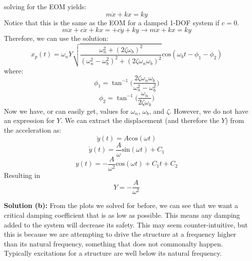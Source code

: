 \documentclass[12pt,letter]{article}
\begin{document}
\begin{example}
			solving for the EOM yields:
			\begin{equation}
				m\ddot{x} + kx = ky
			\end{equation} 				
			Notice that this is the same as the EOM for a damped 1-DOF system if $c=0$.	
			\begin{equation}
			m\ddot{x} + c\dot{x} + kx = + c\dot{y} + ky \rightarrow m\ddot{x} + kx = ky
			\end{equation}
			Therefore, we can use the solution:
			\begin{equation}
				x_p(t) = 	\omega_n Y   \sqrt{\frac{\omega_n^2 + (2 \zeta \omega_b)^2 }{(\omega_n^2 - \omega_b^2)^2 +  (2\zeta \omega_n \omega_b)^2} }  \text{cos}(\omega_bt - \phi_1 - \phi_2)
			\end{equation}
			where:
			\begin{equation}
				\phi_1 = \tan^{-1} \bigg(\frac{2\zeta \omega_n \omega_b}{\omega_n^2 - \omega_b^2}\bigg)
			\end{equation}	
			\begin{equation}
				\phi_2 = \tan^{-1} \bigg(\frac{\omega_n}{2\zeta \omega_b}\bigg)
			\end{equation}
			Now we have, or can easily get, values for $\omega_n$, $\omega_b$, and $\zeta$. However, we do not have an expression for $Y$. We can extract the displacement (and therefore the $Y$) from the acceleration as:
			\begin{equation}
				\ddot{y}(t) = A \text{cos}(\omega t)
			\end{equation} 				
			\begin{equation}
				\dot{y}(t) = \frac{A}{\omega} \text{sin}(\omega t) + C_1
			\end{equation} 					
			\begin{equation}
				y(t) = - \frac{A}{\omega^2} \text{cos}(\omega t) + C_1t + C_2
			\end{equation} 					
			Resulting in 
			\begin{equation}
				Y = -\frac{A}{\omega^2}
			\end{equation} 			
			
			\noindent\textbf{Solution (b):} From the plots we solved for before, we can see that we want a critical damping coefficient that is as low as possible. This means any damping added to the system will decrease its safety. This may seem counter-intuitive, but this is because we are attempting to drive the structure at a frequency higher than its natural frequency, something that does not commonalty happen. Typically excitations for a structure are well below its natural frequency.  			
		
		\end{example}			





	
\end{document}
